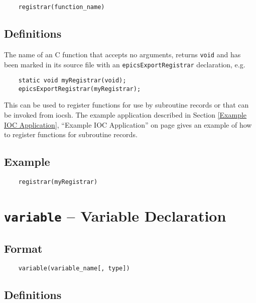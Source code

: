 \begin{verbatim}
    registrar(function_name)
\end{verbatim}

\subsection{Definitions}

\begin{description}
\item [function\_name] The name of an C function that accepts no arguments, returns \verb|void| and has been marked in
its source file with an \verb|epicsExportRegistrar| declaration, e.g.
\end{description}

\begin{verbatim}
    static void myRegistrar(void);
    epicsExportRegistrar(myRegistrar);
\end{verbatim}

This can be used to register functions for use by subroutine records or that can be invoked from iocsh. The example 
application described in Section \ref{Example IOC Application}, ``Example IOC Application'' on page \pageref{Example IOC Application}
gives an example of how to register functions for subroutine records.

\subsection{Example}

\begin{verbatim}
    registrar(myRegistrar)
\end{verbatim}

\section{\texttt{variable} -- Variable Declaration}

\subsection{Format}

\begin{verbatim}
    variable(variable_name[, type])
\end{verbatim}

\subsection{Definitions}

